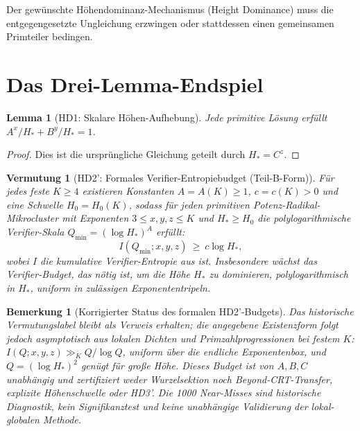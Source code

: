 \documentclass[11pt,a4paper]{article}
\newtheorem{lemma}[theorem]{Lemma}
\newtheorem{conjecture}[theorem]{Vermutung}
\newtheorem{remark}[theorem]{Bemerkung}
\begin{document}
Der gewünschte Höhendominanz-Mechanismus (Height Dominance) muss die entgegengesetzte Ungleichung erzwingen oder stattdessen einen gemeinsamen Primteiler bedingen.

\section{Das Drei-Lemma-Endspiel}

\begin{lemma}[HD1: Skalare Höhen-Aufhebung]
\label{lem:hd1}
Jede primitive Lösung erfüllt
$A^x/H_* + B^y/H_* = 1$.
\end{lemma}

\begin{proof}
Dies ist die ursprüngliche Gleichung geteilt durch $H_*=C^z$.
\end{proof}

\begin{conjecture}[HD2': Formales Verifier-Entropiebudget (Teil-B-Form)]
\label{conj:hd2prime}
Für jedes feste $K \ge 4$ existieren Konstanten $A=A(K) \ge 1$,
$c=c(K) > 0$ und eine Schwelle $H_{0}=H_{0}(K)$, sodass für jeden
primitiven Potenz-Radikal-Mikrocluster mit Exponenten $3 \le x,y,z \le K$
und $H_* \ge H_{0}$ die polylogarithmische Verifier-Skala
$Q_{\min} = (\log H_*)^{A}$ erfüllt:
\[
  I(Q_{\min};x,y,z) \ \ge\ c \log H_*,
\]
wobei $I$ die kumulative Verifier-Entropie aus  ist.
Insbesondere wächst das Verifier-Budget, das nötig ist, um die Höhe
$H_*$ zu dominieren, polylogarithmisch in $H_*$, uniform in zulässigen
Exponententripeln.
\end{conjecture}

\begin{remark}[Korrigierter Status des formalen HD2'-Budgets]
Das historische Vermutungslabel bleibt als Verweis erhalten; die angegebene
Existenzform folgt jedoch asymptotisch aus lokalen Dichten und Primzahlprogressionen
bei festem $K$: $I(Q;x,y,z)\gg_K Q/\log Q$, uniform über die endliche
Exponentenbox, und $Q=(\log H_*)^2$ genügt für große Höhe.
Dieses Budget ist von $A,B,C$ unabhängig und zertifiziert weder Wurzelsektion
noch Beyond-CRT-Transfer, explizite Höhenschwelle oder HD3'.
Die 1000 Near-Misses sind historische Diagnostik, kein Signifikanztest und
keine unabhängige Validierung der lokal-globalen Methode.
\end{remark}
\end{document}
